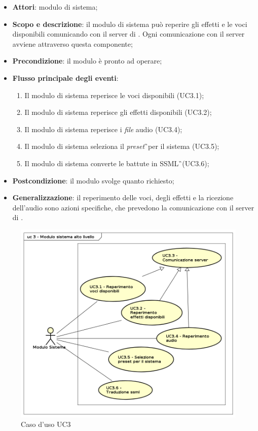 \begin{itemize}
\item \textbf{Attori}: modulo di sistema;
\item \textbf{Scopo e descrizione}: il modulo di sistema può reperire gli effetti e le voci disponibili comunicando con il server di \AZIENDA. Ogni comunicazione con il server avviene attraverso questa componente;
\item \textbf{Precondizione}: il modulo è pronto ad operare;
\item \textbf{Flusso principale degli eventi}:
\begin{enumerate}
\item Il modulo di sistema reperisce le voci disponibili (UC3.1);
\item Il modulo di sistema reperisce gli effetti disponibili (UC3.2);
\item Il modulo di sistema reperisce i \textit{file} audio (UC3.4);
\item Il modulo di sistema seleziona il \textit{preset}\G\ per il sistema (UC3.5);
\item Il modulo di sistema converte le battute in SSML\G\ (UC3.6);
\end{enumerate}
\item \textbf{Postcondizione}: il modulo svolge quanto richiesto;
\item \textbf{Generalizzazione}: il reperimento delle voci, degli effetti e la ricezione dell'audio sono azioni specifiche, che prevedono la comunicazione con il server di \AZIENDA.
\end{itemize}
\begin{figure}[htbp]
\centering
\includegraphics[scale=0.5]{immagini/uc3_modulo_sistema_alto_livello.png}
\captionsetup{labelfont=bf}
\caption{Caso d'uso UC3}
\end{figure}
\newpage

